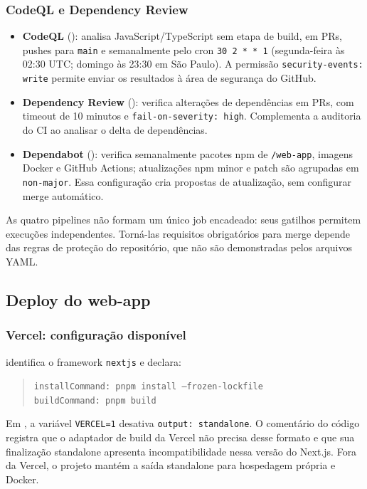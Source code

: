 \documentclass[12pt,a4paper]{article}
\begin{document}
\subsubsection{CodeQL e Dependency Review}
\begin{itemize}
  \item \textbf{CodeQL} (): analisa JavaScript/TypeScript sem etapa de build, em PRs, pushes para \texttt{main} e semanalmente pelo cron \texttt{30 2 * * 1} (segunda-feira às 02:30 UTC; domingo às 23:30 em São Paulo). A permissão \texttt{security-events: write} permite enviar os resultados à área de segurança do GitHub.
  \item \textbf{Dependency Review} (): verifica alterações de dependências em PRs, com timeout de 10 minutos e \texttt{fail-on-severity: high}. Complementa a auditoria do CI ao analisar o delta de dependências.
  \item \textbf{Dependabot} (): verifica semanalmente pacotes npm de \texttt{/web-app}, imagens Docker e GitHub Actions; atualizações npm minor e patch são agrupadas em \texttt{non-major}. Essa configuração cria propostas de atualização, sem configurar merge automático.
\end{itemize}

As quatro pipelines não formam um único job encadeado: seus gatilhos permitem execuções independentes. Torná-las requisitos obrigatórios para merge depende das regras de proteção do repositório, que não são demonstradas pelos arquivos YAML.

\subsection{Deploy do web-app}
\subsubsection{Vercel: configuração disponível}
 identifica o framework \texttt{nextjs} e declara:
\begin{quote}
\texttt{installCommand: pnpm install --frozen-lockfile}\\
\texttt{buildCommand: pnpm build}
\end{quote}

Em , a variável \texttt{VERCEL=1} desativa \texttt{output: standalone}. O comentário do código registra que o adaptador de build da Vercel não precisa desse formato e que sua finalização standalone apresenta incompatibilidade nessa versão do Next.js. Fora da Vercel, o projeto mantém a saída standalone para hospedagem própria e Docker.
\end{document}
